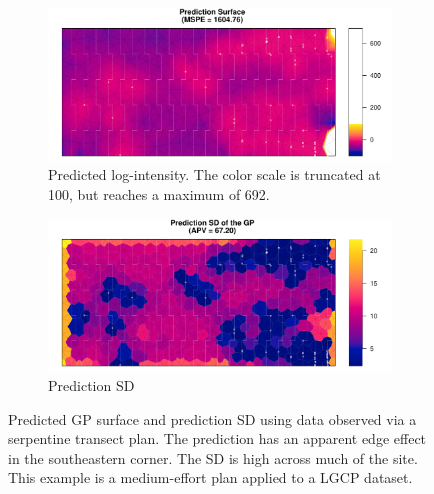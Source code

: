 \documentclass[review]{elsarticle}
\begin{document}
\begin{figure}

\begin{subfigure}{5in}
\includegraphics[width=5in]{../graphics/lambda-Serp000148-LGCP000004.pdf}
\caption{Predicted log-intensity. The color scale is truncated at 100, but
reaches a maximum of 692.}
\label{lambdaserp000148lgcp}
\end{subfigure}

\begin{subfigure}{5in}
\includegraphics[width=5in]{../graphics/lambdaSD-Serp000148-LGCP000004.pdf}
\caption{Prediction SD}
\label{sdserp000148lgcp}
\end{subfigure}

\caption{Predicted GP surface and prediction SD using data observed via a
serpentine transect plan. The prediction has an apparent edge effect in the
southeastern corner. The SD is high across much of the site. This example is
a medium-effort plan applied to a LGCP dataset.}
\label{serp000148}
\end{figure}
\end{document}
